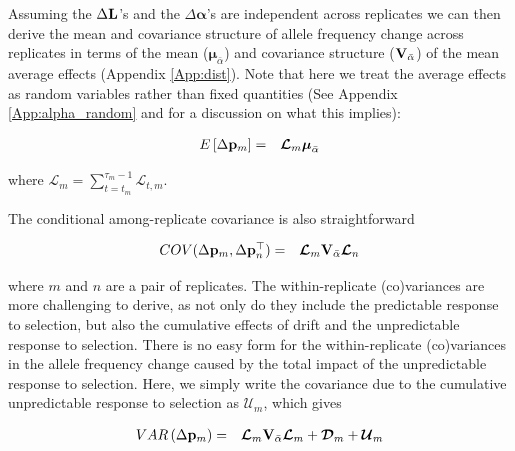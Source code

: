 \documentclass[12pt]{article}
\begin{document}
\begin{bibunit}
Assuming the $\Delta {\bf L}$'s and the $\Delta\boldsymbol{\alpha}$'s are independent across replicates we can then derive the mean and covariance structure of allele frequency change across replicates in terms of the mean ($\boldsymbol{\mu}_{\bar{\alpha}}$) and covariance structure (${\bf V}_{\bar{\alpha}}$) of the mean average effects (Appendix \ref{App:dist}). Note that here we treat the average effects as random variables rather than fixed quantities (See Appendix \ref{App:alpha_random} and \citet{gianola2009additive} for a discussion on what this implies):

\begin{equation}
\begin{array}{rl}
E\left[\Delta {\bf p}_m\right]
=& \boldsymbol{\mathcal{L}}_m\boldsymbol{\mu}_{\bar{\alpha}}\\
\end{array}
\label{eq:Edelta}
\end{equation}

where $\boldsymbol{\mathcal{L}}_m=\sum_{t=t_m}^{\tau_m-1}\boldsymbol{\mathcal{L}}_{t,m}$. 

The conditional among-replicate covariance is also straightforward

\begin{equation}
\begin{array}{rl}
COV(\Delta {\bf p}_m, \Delta {\bf p}_n^{\top})
=&\boldsymbol{\mathcal{L}}_m{\bf V}_{\bar{\alpha}}\boldsymbol{\mathcal{L}}_n\\
\end{array}
\label{eq:covdelta}
\end{equation}

where $m$ and $n$ are a pair of replicates. The within-replicate (co)variances are more challenging to derive,  as not only do they include the predictable response to selection, but also the cumulative effects of drift and the unpredictable response to selection. There is no easy form for the within-replicate (co)variances in the allele frequency change caused by the total impact of the unpredictable response to selection. Here, we simply write the covariance due to the cumulative unpredictable response to selection as $\boldsymbol{\mathcal{U}}_m$, which gives

\begin{equation}
\begin{array}{rl}
VAR\left(\Delta {\bf p}_m\right) =&\boldsymbol{\mathcal{L}}_m{\bf V}_{\bar{\alpha}}\boldsymbol{\mathcal{L}}_m+\boldsymbol{\mathcal{D}}_m+\boldsymbol{\mathcal{U}}_m\\
\end{array}
\end{equation}


\end{bibunit}
\end{document}
